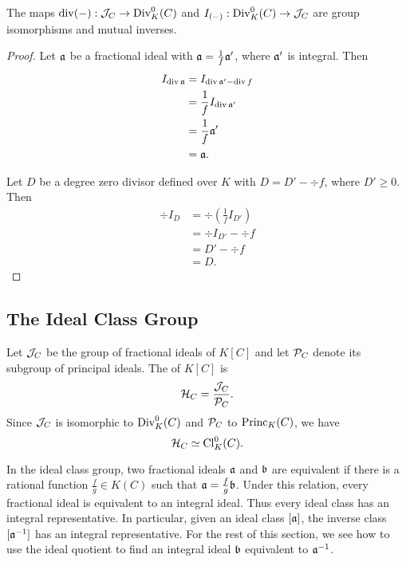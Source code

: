 \begin{theorem}
  The maps $\div(-) : \cal J_C \to \Div_K^0(C)$ and $I_{(-)} : \Div_K^0(C) \to \cal J_C$
  are group isomorphisms and mutual inverses.
\end{theorem}
\begin{proof}
  Let $\frak a$ be a fractional ideal with
  $\frak a = \frac 1 f \frak a'$,
  where $\frak a'$ is integral. Then
  \begin{align*}
    I_{\div \frak a}
      &= I_{\div \frak a' - \div f} \\
      &= \frac 1 f I_{\div \frak a'} \\
      &= \frac 1 f \frak a' \\
      &= \frak a.
  \end{align*}
  
  Let $D$ be a degree zero divisor defined over $K$ with
  $D = D' - \div f$, where $D' \geq 0$. Then
  \begin{align*}
    \div I_D
      &= \div \left( \frac 1 f I_{D'} \right) \\
      &= \div I_{D'} - \div f \\
      &= D' - \div f \\
      &= D.
  \end{align*}
\end{proof}




\subsection{The Ideal Class Group}

Let $\cal J_C$ be the group of fractional ideals of $K[C]$ and let $\cal P_C$ denote its subgroup of principal ideals.
The  of $K[C]$ is
\[ \cal H_C = \frac {\cal J_C} {\cal P_C}. \]
Since $\cal J_C$ is isomorphic to $\Div_K^0(C)$ and $\cal P_C$ to $\Princ_K(C)$, we have
\[ \cal H_C \simeq \Cl_K^0(C). \]

In the ideal class group, two fractional ideals $\frak a$ and $\frak b$ are equivalent
if there is a rational function $\frac f g \in K(C)$ such that $\frak a = \frac f g \frak b$.
Under this relation, every fractional ideal is equivalent to an integral ideal.
Thus every ideal class has an integral representative.
In particular, given an ideal class $[\frak a]$, the inverse class $[\frak a\inv]$ has an integral representative.
For the rest of this section, we see how to use the ideal quotient to find an integral ideal $\frak b$ equivalent to $\frak a \inv$.

